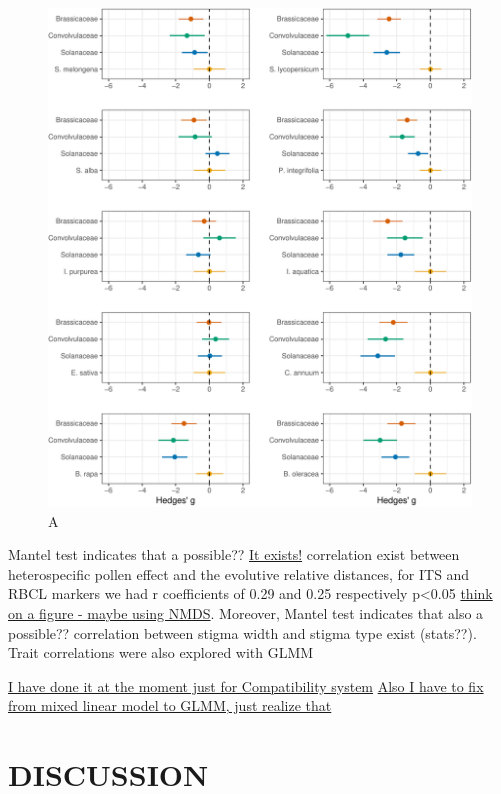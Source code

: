 \documentclass[11pt,a4paper]{article}
\begin{document}
\newpage

\begin{figure}
\centering
\includegraphics{output/figures/unnamed-chunk-6-1.pdf}
\caption{A}
\end{figure}

\newpage

Mantel test indicates that a possible?? \href{}{It exists!} correlation
exist between heterospecific pollen effect and the evolutive relative
distances, for ITS and RBCL markers we had r coefficients of 0.29 and
0.25 respectively p\textless{}0.05 \href{}{think on a figure - maybe
using NMDS}. Moreover, Mantel test indicates that also a possible??
correlation between stigma width and stigma type exist (stats??). Trait
correlations were also explored with GLMM

\href{Jose}{I have done it at the moment just for Compatibility system}
\href{Jose}{Also I have to fix from mixed linear model to GLMM, just
realize that}

\newpage

\section{DISCUSSION}\label{discussion}
\end{document}
